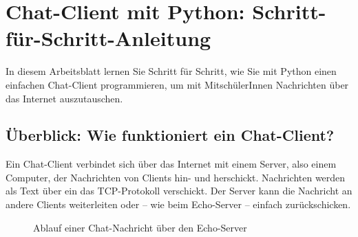 \newcommand{\ipPlaceHolder}{
    \foreach \i in {1,...,3}{\TextField[name=ip\i, width=1.5cm,print,borderwidth=0, backgroundcolor={0.9 0.9 0.9}]{}.}\TextField[name=ip4, width=1.5cm,print,borderwidth=0, backgroundcolor={0.9 0.9 0.9}]{}
}

\chapter{Chat-Client mit Python: Schritt-für-Schritt-Anleitung}

In diesem Arbeitsblatt lernen Sie Schritt für Schritt, wie Sie mit Python einen einfachen Chat-Client programmieren, um mit MitschülerInnen Nachrichten über das Internet auszutauschen.

\section{Überblick: Wie funktioniert ein Chat-Client?}

Ein Chat-Client verbindet sich über das Internet mit einem Server, also einem Computer, der Nachrichten von Clients hin- und herschickt. Nachrichten werden als Text über ein das \gls{TCP}-Protokoll verschickt. Der Server kann die Nachricht an andere Clients weiterleiten oder – wie beim Echo-Server – einfach zurückschicken.

\begin{figure}[H]
    \centering
    \caption{Ablauf einer Chat-Nachricht über den Echo-Server}
\end{figure}

